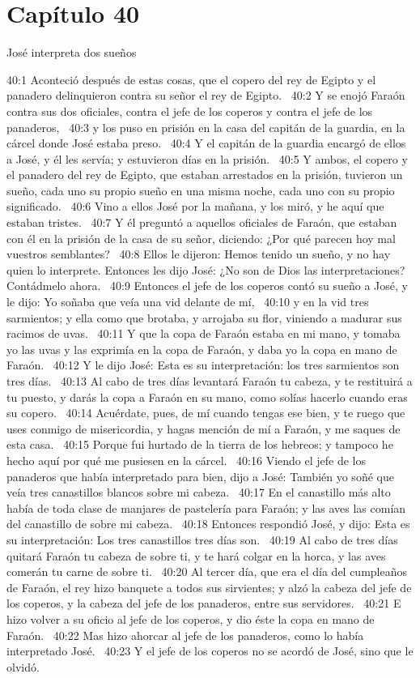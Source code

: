 \section*{Capítulo 40}

José interpreta dos sueños  

40:1 Aconteció después de estas cosas, que el copero del rey de Egipto y el panadero delinquieron contra su señor el rey de Egipto.  
40:2 Y se enojó Faraón contra sus dos oficiales, contra el jefe de los coperos y contra el jefe de los panaderos,  
40:3 y los puso en prisión en la casa del capitán de la guardia, en la cárcel donde José estaba preso.  
40:4 Y el capitán de la guardia encargó de ellos a José, y él les servía; y estuvieron días en la prisión.  
40:5 Y ambos, el copero y el panadero del rey de Egipto, que estaban arrestados en la prisión, tuvieron un sueño, cada uno su propio sueño en una misma noche, cada uno con su propio significado.  
40:6 Vino a ellos José por la mañana, y los miró, y he aquí que estaban tristes.  
40:7 Y él preguntó a aquellos oficiales de Faraón, que estaban con él en la prisión de la casa de su señor, diciendo: ¿Por qué parecen hoy mal vuestros semblantes?  
40:8 Ellos le dijeron: Hemos tenido un sueño, y no hay quien lo interprete. Entonces les dijo José: ¿No son de Dios las interpretaciones? Contádmelo ahora.  
40:9 Entonces el jefe de los coperos contó su sueño a José, y le dijo: Yo soñaba que veía una vid delante de mí,  
40:10 y en la vid tres sarmientos; y ella como que brotaba, y arrojaba su flor, viniendo a madurar sus racimos de uvas.  
40:11 Y que la copa de Faraón estaba en mi mano, y tomaba yo las uvas y las exprimía en la copa de Faraón, y daba yo la copa en mano de Faraón.  
40:12 Y le dijo José: Esta es su interpretación: los tres sarmientos son tres días.  
40:13 Al cabo de tres días levantará Faraón tu cabeza, y te restituirá a tu puesto, y darás la copa a Faraón en su mano, como solías hacerlo cuando eras su copero.  
40:14 Acuérdate, pues, de mí cuando tengas ese bien, y te ruego que uses conmigo de misericordia, y hagas mención de mí a Faraón, y me saques de esta casa.  
40:15 Porque fui hurtado de la tierra de los hebreos; y tampoco he hecho aquí por qué me pusiesen en la cárcel.  
40:16 Viendo el jefe de los panaderos que había interpretado para bien, dijo a José: También yo soñé que veía tres canastillos blancos sobre mi cabeza.  
40:17 En el canastillo más alto había de toda clase de manjares de pastelería para Faraón; y las aves las comían del canastillo de sobre mi cabeza.  
40:18 Entonces respondió José, y dijo: Esta es su interpretación: Los tres canastillos tres días son.  
40:19 Al cabo de tres días quitará Faraón tu cabeza de sobre ti, y te hará colgar en la horca, y las aves comerán tu carne de sobre ti.  
40:20 Al tercer día, que era el día del cumpleaños de Faraón, el rey hizo banquete a todos sus sirvientes; y alzó la cabeza del jefe de los coperos, y la cabeza del jefe de los panaderos, entre sus servidores.  
40:21 E hizo volver a su oficio al jefe de los coperos, y dio éste la copa en mano de Faraón.  
40:22 Mas hizo ahorcar al jefe de los panaderos, como lo había interpretado José.  
40:23 Y el jefe de los coperos no se acordó de José, sino que le olvidó.  
